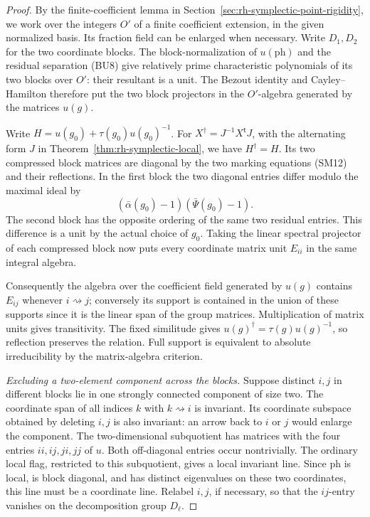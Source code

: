 \begin{proof}
By the finite-coefficient lemma in
Section~\ref{sec:rh-symplectic-point-rigidity}, we work over
the integers \(O'\) of a finite coefficient extension, in the
given normalized basis. Its fraction field can be enlarged
when necessary. Write \(D_1,D_2\) for the two coordinate
blocks. The block-normalization of \(u(\mathrm{ph})\) and
the residual separation (BU8) give relatively prime
characteristic polynomials of its two blocks over \(O'\):
their resultant is a unit. The Bezout identity and
Cayley--Hamilton therefore put the two block projectors in
the \(O'\)-algebra generated by the matrices \(u(g)\).

Write \(H=u(g_0)+\tau(g_0)u(g_0)^{-1}\).
For \(X^\dagger=J^{-1}X^{\mathsf t}J\), with the alternating
form \(J\) in Theorem~\ref{thm:rh-symplectic-local},
we have \(H^\dagger=H\). Its two compressed block matrices
are diagonal by the two marking equations (SM12) and their
reflections. In the first block the two diagonal entries
differ modulo the maximal ideal by
\[
          (\bar\alpha(g_0)-1)(\bar\Psi(g_0)-1).
\]
The second block has the opposite ordering of the same two
residual entries. This difference is a unit by the actual
choice of \(g_0\). Taking the linear spectral projector of
each compressed block now puts every coordinate matrix
unit \(E_{ii}\) in the same integral algebra.

Consequently the algebra over the coefficient field
generated by \(u(g)\) contains \(E_{ij}\) whenever
\(i\rightsquigarrow j\); conversely its support is contained
in the union of these supports since it is the linear span
of the group matrices. Multiplication of matrix units gives
transitivity. The fixed similitude gives
\(u(g)^\dagger=\tau(g)u(g)^{-1}\), so reflection preserves
the relation. Full support is equivalent to absolute
irreducibility by the matrix-algebra criterion.

\emph{Excluding a two-element component across the blocks.}
Suppose distinct \(i,j\) in different blocks lie in one
strongly connected component of size two. The coordinate
span of all indices \(k\) with \(k\rightsquigarrow i\)
is invariant.
Its coordinate subspace obtained by deleting \(i,j\) is
also invariant: an arrow back to \(i\) or \(j\) would
enlarge the component. The two-dimensional subquotient
has matrices with the four entries \(ii,ij,ji,jj\) of \(u\).
Both off-diagonal entries occur nontrivially. The ordinary
local flag, restricted to this subquotient, gives a
local invariant line. Since \(\mathrm{ph}\) is local,
is block diagonal, and has distinct eigenvalues on
these two coordinates, this line must be a coordinate
line. Relabel \(i,j\), if necessary, so that the \(ij\)-entry
vanishes on the decomposition group \(D_\ell\).


\end{proof}
